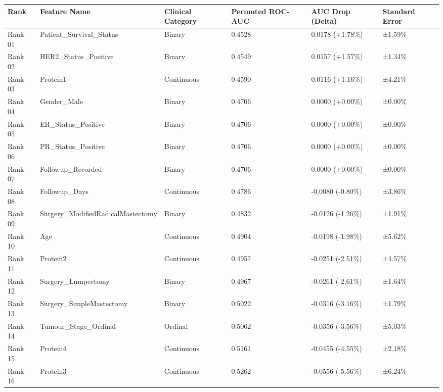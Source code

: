 \begin{tabular}{llllll}
\toprule
Rank & Feature Name & Clinical Category & Permuted ROC-AUC & AUC Drop (Delta) & Standard Error \\
\midrule
Rank 01 & Patient\_Survival\_Status & Binary & 0.4528 & 0.0178 (+1.78\%) & ±1.59\% \\
Rank 02 & HER2\_Status\_Positive & Binary & 0.4549 & 0.0157 (+1.57\%) & ±1.34\% \\
Rank 03 & Protein1 & Continuous & 0.4590 & 0.0116 (+1.16\%) & ±4.21\% \\
Rank 04 & Gender\_Male & Binary & 0.4706 & 0.0000 (+0.00\%) & ±0.00\% \\
Rank 05 & ER\_Status\_Positive & Binary & 0.4706 & 0.0000 (+0.00\%) & ±0.00\% \\
Rank 06 & PR\_Status\_Positive & Binary & 0.4706 & 0.0000 (+0.00\%) & ±0.00\% \\
Rank 07 & Followup\_Recorded & Binary & 0.4706 & 0.0000 (+0.00\%) & ±0.00\% \\
Rank 08 & Followup\_Days & Continuous & 0.4786 & -0.0080 (-0.80\%) & ±3.86\% \\
Rank 09 & Surgery\_ModifiedRadicalMastectomy & Binary & 0.4832 & -0.0126 (-1.26\%) & ±1.91\% \\
Rank 10 & Age & Continuous & 0.4904 & -0.0198 (-1.98\%) & ±5.62\% \\
Rank 11 & Protein2 & Continuous & 0.4957 & -0.0251 (-2.51\%) & ±4.57\% \\
Rank 12 & Surgery\_Lumpectomy & Binary & 0.4967 & -0.0261 (-2.61\%) & ±1.64\% \\
Rank 13 & Surgery\_SimpleMastectomy & Binary & 0.5022 & -0.0316 (-3.16\%) & ±1.79\% \\
Rank 14 & Tumour\_Stage\_Ordinal & Ordinal & 0.5062 & -0.0356 (-3.56\%) & ±5.03\% \\
Rank 15 & Protein4 & Continuous & 0.5161 & -0.0455 (-4.55\%) & ±2.18\% \\
Rank 16 & Protein3 & Continuous & 0.5262 & -0.0556 (-5.56\%) & ±6.24\% \\
\bottomrule
\end{tabular}

